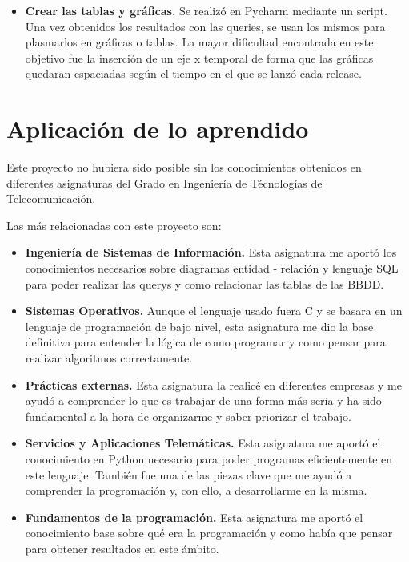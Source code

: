 \documentclass[a4paper, 12pt]{book}
\begin{document}
\begin{itemize}
	
	\item \textbf {Crear las tablas y gráficas.} Se realizó en Pycharm mediante un script. Una vez obtenidos los resultados con las queries, se usan los mismos para plasmarlos en gráficas o tablas. La mayor dificultad encontrada en este objetivo fue la inserción de un eje x temporal de forma que las gráficas quedaran espaciadas según el tiempo en el que se lanzó cada release.
\end{itemize}


\section{Aplicación de lo aprendido}
\label{sec:aplicacion}

Este proyecto no hubiera sido posible sin los conocimientos obtenidos en diferentes asignaturas del Grado en Ingeniería de Técnologías de Telecomunicación.

Las más relacionadas con este proyecto son: 

\begin{itemize}
	\item \textbf {Ingeniería de Sistemas de Información.} Esta asignatura me aportó los conocimientos necesarios sobre diagramas entidad - relación y lenguaje SQL para poder realizar las querys y como relacionar las tablas de las BBDD.
	
	\item \textbf {Sistemas Operativos.} Aunque el lenguaje usado fuera C y se basara en un lenguaje de programación de bajo nivel, esta asignatura me dio la base definitiva para entender la lógica de como programar y como pensar para realizar algoritmos correctamente.
	
	\item \textbf {Prácticas externas.} Esta asignatura la realicé en diferentes empresas y me ayudó a comprender lo que es trabajar de una forma más seria y ha sido fundamental a la hora de organizarme y saber priorizar el trabajo.
	
	\item \textbf {Servicios y Aplicaciones Telemáticas.} Esta asignatura me aportó el conocimiento en Python necesario para poder programas eficientemente en este lenguaje. También fue una de las piezas clave que me ayudó a comprender la programación y, con ello, a desarrollarme en la misma.
	
	\item \textbf {Fundamentos de la programación.} Esta asignatura me aportó el conocimiento base sobre qué era la programación y como había que pensar para obtener resultados en este ámbito.
	
\end{itemize}
\end{document}

